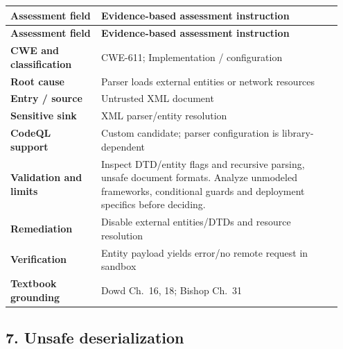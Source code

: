 \documentclass[11pt,letterpaper,oneside]{book}
\begin{document}
\small
\setlength{\tabcolsep}{2pt}
\renewcommand{\arraystretch}{1.18}
\begin{longtable}{>{\raggedright\arraybackslash}p{0.26\linewidth}>{\raggedright\arraybackslash}p{0.69\linewidth}}
\toprule
\textbf{Assessment field} & \textbf{Evidence-based assessment instruction}\\
\midrule
\endfirsthead
\toprule
\textbf{Assessment field} & \textbf{Evidence-based assessment instruction}\\
\midrule
\endhead
\textbf{CWE and classification} & CWE-611; Implementation / configuration\\
\textbf{Root cause} & Parser loads external entities or network resources\\
\textbf{Entry / source} & Untrusted XML document\\
\textbf{Sensitive sink} & XML parser/entity resolution\\
\textbf{CodeQL support} & Custom candidate; parser configuration is library-dependent\\
\textbf{Validation and limits} & Inspect DTD/entity flags and recursive parsing, unsafe document formats. Analyze unmodeled frameworks, conditional guards and deployment specifics before deciding.\\
\textbf{Remediation} & Disable external entities/DTDs and resource resolution\\
\textbf{Verification} & Entity payload yields error/no remote request in sandbox\\
\textbf{Textbook grounding} & Dowd Ch.~16, 18; Bishop Ch.~31\\
\bottomrule
\end{longtable}
\normalsize

\subsection{7. Unsafe deserialization}
\end{document}

